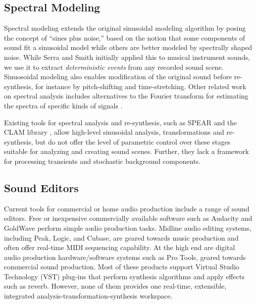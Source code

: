 \documentclass[twoside]{article}
\begin{document}
\subsection{Spectral Modeling}

Spectral modeling \cite{paper:85:Serra89} extends the original sinusoidal modeling algorithm 
\cite{paper:85:McAulay86} by posing the concept of ``sines plus noise,'' based on the notion that 
some components of sound fit a sinusoidal model while others are better modeled by spectrally 
shaped noise. While Serra and Smith \cite{paper:85:Serra89} initially applied this to musical instrument 
sounds, we use it to extract \emph{deterministic events} from any recorded sound scene. 
Sinuosoidal modeling also enables modification of the original sound before re-synthesis, for
instance by pitch-shifting and time-stretching.
Other related work on spectral analysis includes alternatives to 
the Fourier transform for estimating the spectra of specific kinds of 
signals \cite{paper:85:Qi02,paper:85:Thornburg03}. 

Existing tools for spectral analysis and re-synthesis, such as SPEAR \cite{paper:85:Klingbeil05}
and the CLAM library \cite{paper:85:Amatriain05}, allow high-level sinusoidal analysis, 
transformations and re-synthesis, but do not offer the level of parametric control over 
these stages suitable for analyzing and creating sound scenes. Further, they lack a 
framework for processing transients and stochastic background components.

\subsection{Sound Editors}

Current tools for commercial or home audio production include a range of sound editors. Free 
or inexpensive commercially available software such as Audacity and GoldWave perform simple 
audio production tasks. Midline audio editing systems, including Peak, Logic, and Cubase, are 
geared towards music production and often offer real-time MIDI sequencing capability. At the 
high end are digital audio production hardware/software systems such as Pro Tools, geared 
towards commercial sound production. Most of these products support Virtual Studio Technology 
(VST) plug-ins that perform synthesis algorithms and apply effects such as reverb. However, 
none of them provides one real-time, extensible, integrated analysis-transformation-synthesis 
workspace.  

\end{document}
